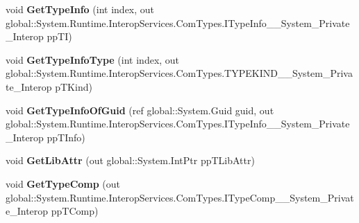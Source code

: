 \begin{DoxyCompactItemize}
\item 
\mbox{\label{interface_system_1_1_runtime_1_1_interop_services_1_1_com_types_1_1_i_type_lib_____system___private___interop_a294102830607259f08459d9bd9c31d4e}} 
void {\bfseries Get\+Type\+Info} (int index, out global\+::\+System.\+Runtime.\+Interop\+Services.\+Com\+Types.\+I\+Type\+Info\+\_\+\+\_\+\+System\+\_\+\+Private\+\_\+\+Interop pp\+TI)
\item 
\mbox{\label{interface_system_1_1_runtime_1_1_interop_services_1_1_com_types_1_1_i_type_lib_____system___private___interop_a986454fa9fc37dfd64ab594c0fc42232}} 
void {\bfseries Get\+Type\+Info\+Type} (int index, out global\+::\+System.\+Runtime.\+Interop\+Services.\+Com\+Types.\+T\+Y\+P\+E\+K\+I\+N\+D\+\_\+\+\_\+\+System\+\_\+\+Private\+\_\+\+Interop p\+T\+Kind)
\item 
\mbox{\label{interface_system_1_1_runtime_1_1_interop_services_1_1_com_types_1_1_i_type_lib_____system___private___interop_a29c3f76d3f2e6750db6203a42ad93a69}} 
void {\bfseries Get\+Type\+Info\+Of\+Guid} (ref global\+::\+System.\+Guid guid, out global\+::\+System.\+Runtime.\+Interop\+Services.\+Com\+Types.\+I\+Type\+Info\+\_\+\+\_\+\+System\+\_\+\+Private\+\_\+\+Interop pp\+T\+Info)
\item 
\mbox{\label{interface_system_1_1_runtime_1_1_interop_services_1_1_com_types_1_1_i_type_lib_____system___private___interop_ac1b35c8576242797a74466d7999c3d30}} 
void {\bfseries Get\+Lib\+Attr} (out global\+::\+System.\+Int\+Ptr pp\+T\+Lib\+Attr)
\item 
\mbox{\label{interface_system_1_1_runtime_1_1_interop_services_1_1_com_types_1_1_i_type_lib_____system___private___interop_a1ec943ec9b2d14dd70c3367706164a45}} 
void {\bfseries Get\+Type\+Comp} (out global\+::\+System.\+Runtime.\+Interop\+Services.\+Com\+Types.\+I\+Type\+Comp\+\_\+\+\_\+\+System\+\_\+\+Private\+\_\+\+Interop pp\+T\+Comp)

\end{DoxyCompactItemize}
